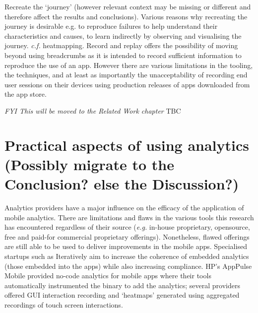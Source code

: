 



Recreate the `journey' (however relevant context may be missing or different and therefore affect the results and conclusions). Various reasons why recreating the journey is desirable e.g. to reproduce failures to help understand their characteristics and causes, to learn indirectly by observing and visualising the journey. \emph{c.f.} heatmapping. Record and replay offers the possibility of moving beyond using breadcrumbs as it is intended to record sufficient information to reproduce the use of an app. However there are various limitations in the tooling, the techniques, and at least as importantly the unacceptability of recording end user sessions on their devices using production releases of apps downloaded from the app store. 

\textit{FYI This will be moved to the Related Work chapter}
TBC


\clearpage
\section[Practical aspects of using analytics]{Practical aspects of using analytics \\ \small{(Possibly migrate to the Conclusion? else the Discussion?)}}
Analytics providers have a major influence on the efficacy of the application of mobile analytics. There are limitations and flaws in the various tools this research has encountered regardless of their source (\emph{e.g.} in-house proprietary, opensource, free and paid-for commercial proprietary offerings). Nonetheless, flawed offerings are still able to be used to deliver improvements in the mobile apps. Specialised startups such as Iteratively aim to increase the coherence of embedded analytics (those embedded into the apps) while also increasing compliance. HP's AppPulse Mobile provided no-code analytics for mobile apps where their tools automatically instrumented the binary to add the analytics; several providers offered GUI interaction recording and `heatmaps' generated using aggregated recordings of touch screen interactions.

